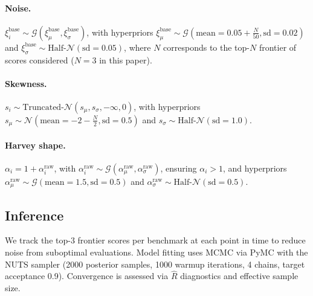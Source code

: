 \documentclass[letterpaper,twocolumn]{article}
\begin{document}
\paragraph{Noise.} $\xi_i^{\text{base}} \sim \mathcal G(\xi^{\text{base}}_{\mu}, \xi^{\text{base}}_{\sigma})$, with hyperpriors $\xi^{\text{base}}_{\mu} \sim \mathcal G(\text{mean} = 0.05 + \frac{N}{50}, \text{sd} = 0.02)$ and $\xi^{\text{base}}_{\sigma} \sim \text{Half-}\mathcal N(\text{sd}=0.05)$, where $N$ corresponds to the top-$N$ frontier of scores considered ($N=3$ in this paper).

\paragraph{Skewness.} $s_i \sim \text{Truncated-}\mathcal N(s_\mu, s_\sigma, -\infty, 0)$, with hyperpriors $s_\mu \sim \mathcal N(\text{mean} = -2 - \frac{N}{2}, \text{sd} = 0.5)$ and $s_\sigma \sim \text{Half-}\mathcal N(\text{sd}=1.0)$.

\paragraph{Harvey shape.} $\alpha_i = 1 + \alpha_i^{\text{raw}}$, with $\alpha_i^{\text{raw}} \sim \mathcal G(\alpha^{\text{raw}}_{\mu}, \alpha^{\text{raw}}_{\sigma})$, ensuring $\alpha_i > 1$, and hyperpriors $\alpha^{\text{raw}}_{\mu} \sim \mathcal G(\text{mean}=1.5, \text{sd}=0.5)$ and $\alpha^{\text{raw}}_{\sigma} \sim \text{Half-}\mathcal N(\text{sd}=0.5)$.

\subsection{Inference}

We track the top-3 frontier scores per benchmark at each point in time to reduce noise from suboptimal evaluations. Model fitting uses MCMC via PyMC \citep{abril-pla_pymc_2023} with the NUTS sampler (2000 posterior samples, 1000 warmup iterations, 4 chains, target acceptance 0.9). Convergence is assessed via $\hat{R}$ diagnostics and effective sample size.
\end{document}

